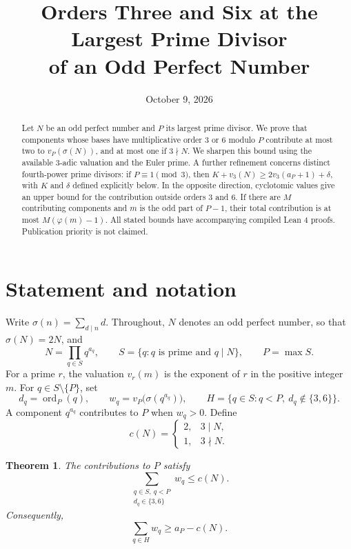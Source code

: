 \documentclass[11pt]{article}
\title{Orders Three and Six at the Largest Prime Divisor\protect\\ of an Odd Perfect Number}
\author{}
\date{October 9, 2026}
\newtheorem{theorem}{Theorem}
\theoremstyle{remark}
\DeclareMathOperator{\ord}{ord}
\begin{document}
\maketitle
\vspace{-1.3em}
\begin{abstract}
Let $N$ be an odd perfect number and $P$ its largest prime divisor. We prove that components whose bases have multiplicative order $3$ or $6$ modulo $P$ contribute at most two to $v_P(\sigma(N))$, and at most one if $3\nmid N$. We sharpen this bound using the available $3$-adic valuation and the Euler prime. A further refinement concerns distinct fourth-power prime divisors: if $P\equiv1\pmod3$, then $K+v_3(N)\ge2v_3(a_P+1)+\delta$, with $K$ and $\delta$ defined explicitly below. In the opposite direction, cyclotomic values give an upper bound for the contribution outside orders $3$ and $6$. If there are $M$ contributing components and $m$ is the odd part of $P-1$, their total contribution is at most $M(\varphi(m)-1)$. All stated bounds have accompanying compiled Lean 4 proofs. Publication priority is not claimed.
\end{abstract}

\section{Statement and notation}

Write $\sigma(n)=\sum_{d\mid n}d$. Throughout, $N$ denotes an odd perfect number, so that $\sigma(N)=2N$, and
\[
 N=\prod_{q\in S}q^{a_q},\qquad
 S=\{q:q\text{ is prime and }q\mid N\},\qquad P=\max S.
\]
For a prime $r$, the valuation $v_r(m)$ is the exponent of $r$ in the positive integer $m$. For $q\in S\setminus\{P\}$, set
\[
 d_q=\ord_P(q),\qquad w_q=v_P\bigl(\sigma(q^{a_q})\bigr),
 \qquad
 H=\{q\in S:q<P,\ d_q\notin\{3,6\}\}.
\]
A component $q^{a_q}$ contributes to $P$ when $w_q>0$. Define
\[
 c(N)=\begin{cases}2,&3\mid N,\\1,&3\nmid N.\end{cases}
\]

\begin{theorem}\label{thm:main}
The contributions to $P$ satisfy
\begin{equation}\label{eq:lowbound}
 \sum_{\substack{q\in S,\ q<P\\d_q\in\{3,6\}}}w_q\le c(N).
\end{equation}
Consequently,
\begin{equation}\label{eq:main}
 \boxed{\displaystyle\sum_{q\in H}w_q\ge a_P-c(N).}
\end{equation}
\end{theorem}
\end{document}

